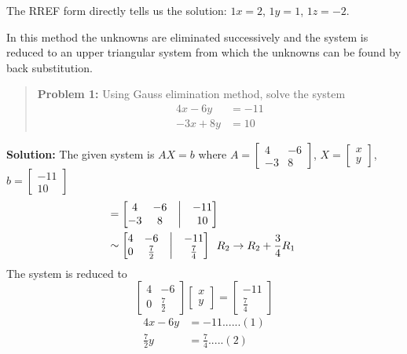 \documentclass[
  letterpaper,
  DIV=11,
  numbers=noendperiod]{scrreprt}
\begin{document}
The RREF form directly tells us the solution: \(1x = 2\), \(1y = 1\),
\(1z = -2\).

In this method the unknowns are eliminated successively and the system
is reduced to an upper triangular system from which the unknowns can be
found by back substitution.

\begin{quote}
\textbf{Problem 1:} Using Gauss elimination method, solve the system
\begin{align*}
4x-6y &=-11\\
-3x+8y &=10
\end{align*}
\end{quote}

\textbf{Solution:} The given system is \(AX=b\) where
\(A=\begin{bmatrix}
    4 &-6\\
    -3 &8
\end{bmatrix}\), \(X=\begin{bmatrix}
x\\
y
\end{bmatrix}\), \(b=\begin{bmatrix}
-11\\
10
\end{bmatrix}\) \begin{align*}
    [A|b]&=\begin{bmatrix}
        4 &-6 &\bigm| &-11\\
        -3 &8 &\bigm| &10
    \end{bmatrix}\\
&\sim \begin{bmatrix}
    4 &-6 &\bigm| &-11\\
    0 &\frac{7}{2} &\bigm| &\frac{7}{4}
\end{bmatrix}\begin{array}{c}
R_2\rightarrow R_2+\dfrac{3}{4}R_1
\end{array}
\end{align*} The system is reduced to \[\begin{bmatrix}
    4 &-6\\
    0 &\frac{7}{2}
\end{bmatrix}\begin{bmatrix}
x\\
y
\end{bmatrix}=\begin{bmatrix}
-11\\
\frac{7}{4}
\end{bmatrix}\] \begin{align*}
    4x-6y &=-11......(1)\\
    \frac{7}{2}y &=\frac{7}{4}.....(2)
\end{align*}
\end{document}
